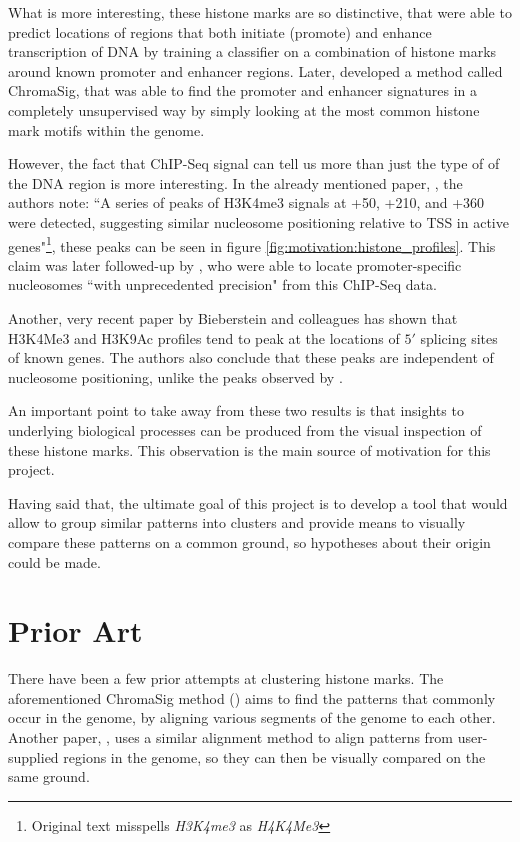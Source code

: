 \documentclass[parskip]{cs4rep}
\newcommand{\histonemodification}[1]{#1}
\begin{document}
What is more interesting, these histone marks are so distinctive, that 
\cite{Heintzman:2007ke} were able to predict locations of regions that both initiate (promote) and enhance transcription of DNA by training a classifier on a combination of histone marks around known promoter and enhancer regions. Later, \cite{Hon:2008wv} developed a method called ChromaSig, that was able to find the promoter and enhancer signatures in a completely unsupervised way by simply looking at the most common histone mark motifs within the genome.

However, the fact that ChIP-Seq signal can tell us more than just the type of of the DNA region is more interesting. In the already mentioned paper, \cite{Barski:2007ww}, the authors note: ``A series of peaks of H3K4me3 signals at +50, +210, and +360 were detected, suggesting similar nucleosome positioning relative to TSS in active genes"\footnote{Original text misspells \emph{H3K4me3} as \emph{H4K4Me3}}, these peaks can be seen in figure \autoref{fig:motivation:histone_profiles}. This claim was later followed-up by \cite{Schmid:2007ue}, who were able to locate promoter-specific nucleosomes ``with unprecedented precision" from this ChIP-Seq data.

Another, very recent paper by Bieberstein and colleagues \cite{Bieberstein:2012tf} has shown that \histonemodification{H3K4Me3} and \histonemodification{H3K9Ac} profiles tend to peak at the locations of $5'$ splicing sites of known genes. The authors also conclude that these peaks are independent of nucleosome positioning, unlike the peaks observed by \cite{Barski:2007ww}.

An important point to take away from these two results is that insights to underlying biological processes can be produced from the visual inspection of these histone marks. This observation is the main source of motivation for this project. 

Having said that, the ultimate goal of this project is to develop a tool that would allow to group similar patterns into clusters and provide means to visually compare these patterns on a common ground, so hypotheses about their origin could be made.

\section{Prior Art}

There have been a few prior attempts at clustering histone marks.
The aforementioned ChromaSig method (\cite{Hon:2008wv}) aims to find the patterns that commonly occur in the genome, by aligning various segments of the genome to each other. Another paper, \cite{Lai:2010ue}, uses a similar alignment method to align patterns from user-supplied regions in the genome, so they can then be visually compared on the same ground.
\end{document}
